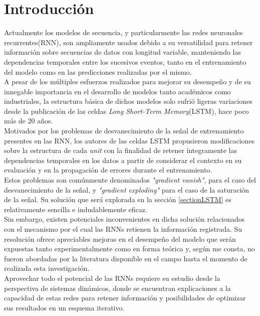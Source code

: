 \documentclass{article}
\begin{document}
	\vspace*{\fill}
	\pagebreak
	
	
	\tableofcontents
	
	\pagebreak
	\section{Introducción}\label{sectionIntroduction}
	
	
	Actualmente los modelos de secuencia, y particularmente las redes neuronales recurrentes(RNN), son ampliamente usados debido a su versatilidad para retener información sobre secuencias de datos con longitud variable, manteniendo las dependencias temporales entre los sucesivos eventos, tanto en el entrenamiento del modelo como en las predicciones realizadas por el mismo.\\
	A pesar de los múltiples esfuerzos realizados para mejorar su desempeño\cite{16ForgateGatePeepholeConnectionsGers} y de su innegable importancia en el desarrollo de modelos tanto académicos\cite{15TransductionGraves} como industriales\cite{12DeepSearch}\cite{13SpeechRecognition}\cite{14RegularizationZaremba}, la estructura básica de dichos modelos solo sufrió ligeras variaciones desde la publicación de las celdas \textit{Long Short-Term Memory}(LSTM), hace poco más de 20 años. \\
	Motivados por los problemas de desvanecimiento de la señal de entrenamiento presentes en las RNN, los autores de las celdas LSTM propusieron modificaciones sobre la estructura de cada \textit{unit} con la finalidad de retener íntegramente las dependencias temporales en los datos a partir de considerar el contexto en su evaluación y en la propagación de errores durante el entrenamiento\cite{42FormerLSTMHochreiter}.\\
	Estos problemas son comúnmente denominados \textit{"gradient vanish"}, para el caso del desvanecimiento de la señal, y  \textit{"gradient exploding"} para el caso de la saturación de la señal. Su solución que será explorada en la sección \ref{sectionLSTM} es relativamente sencilla e indudablemente eficaz.\\
	
	Sin embargo, existen potenciales inconvenientes en dicha solución relacionados con el mecanismo por el cual las RNNs retienen la información registrada. Su resolución ofrece apreciables mejoras en el desempeño del modelo que serán expuestas tanto experimentalmente como en forma teórica y, según me consta, no fueron abordadas por la literatura disponible en el campo hasta el momento de realizada esta investigación.\\
	Aprovechar todo el potencial de las RNNs requiere su estudio desde la perspectiva de sistemas dinámicos, donde se encuentran explicaciones a la capacidad de estas redes para retener información y posibilidades de optimizar sus resultados en un esquema iterativo.\\
	
\end{document}
